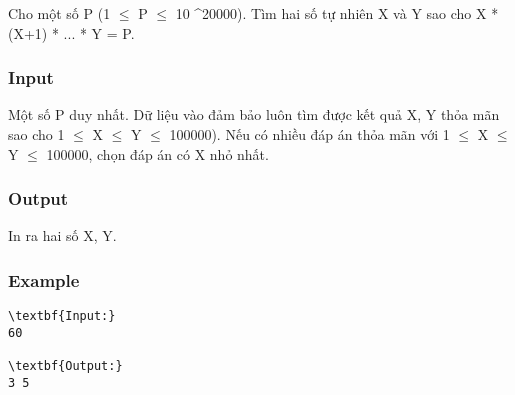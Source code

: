 



   Cho một số P (1  $\le$  P  $\le$  10 \textasciicircum 20000). Tìm hai số tự nhiên X và Y sao cho X * (X+1) * ... * Y = P.  

\subsubsection{   Input  }

   Một số P duy nhất. Dữ liệu vào đảm bảo luôn tìm được kết quả X, Y thỏa mãn sao cho 1  $\le$  X  $\le$  Y  $\le$  100000). Nếu có nhiều đáp án thỏa mãn với 1  $\le$  X  $\le$  Y  $\le$  100000, chọn đáp án có X nhỏ nhất.  

\subsubsection{   Output  }

   In ra hai số X, Y.  

\subsubsection{   Example  }
\begin{verbatim}
\textbf{Input:}
60

\textbf{Output:}
3 5
\end{verbatim}
